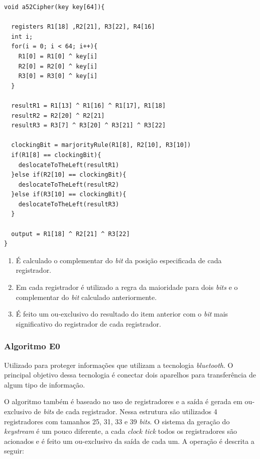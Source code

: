 \begin{lstlisting}[caption={Pseudo-código A5/2}, label=a52-pseudo-code]
void a52Cipher(key key[64]){

  registers R1[18] ,R2[21], R3[22], R4[16]
  int i;
  for(i = 0; i < 64; i++){
  	R1[0] = R1[0] ^ key[i]
	R2[0] = R2[0] ^ key[i]
	R3[0] = R3[0] ^ key[i]  
  }
  
  resultR1 = R1[13] ^ R1[16] ^ R1[17], R1[18]
  resultR2 = R2[20] ^ R2[21]
  resultR3 = R3[7] ^ R3[20] ^ R3[21] ^ R3[22]
  
  clockingBit = marjorityRule(R1[8], R2[10], R3[10])
  if(R1[8] == clockingBit){
  	deslocateToTheLeft(resultR1)
  }else if(R2[10] == clockingBit){
    deslocateToTheLeft(resultR2)
  }else if(R3[10] == clockingBit){
    deslocateToTheLeft(resultR3)
  }
  
  output = R1[18] ^ R2[21] ^ R3[22]
}
    \end{lstlisting}

\begin{enumerate}
	\item É calculado o complementar do \textit{bit} da posição especificada de cada registrador.
	\item Em cada registrador é utilizado a regra da maioridade para dois \textit{bits} e o complementar do \textit{bit} calculado anteriormente. 
	\item É feito um ou-exclusivo do resultado do item anterior com o \textit{bit} mais significativo do registrador de cada registrador.
\end{enumerate}


\subsubsection{Algoritmo E0}
\label{algorithm-e0}

Utilizado para proteger informações que utilizam a tecnologia \textit{bluetooth}. O principal objetivo dessa tecnologia é conectar dois aparelhos para transferência de algum tipo de informação.

O algoritmo também é baseado no uso de registradores e a saída é gerada em ou-exclusivo de \textit{bits} de cada registrador. Nessa estrutura são utilizados 4 registradores com tamanhos 25, 31, 33 e 39 \textit{bits}. O sistema da geração do \textit{keystream} é um pouco diferente, a cada \textit{clock tick} todos os registradores são acionados e é feito um ou-exclusivo da saída de cada um. A operação é descrita a seguir:

